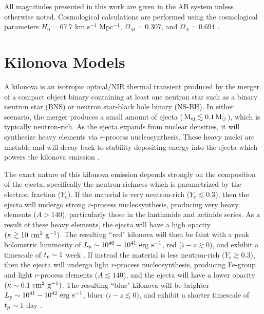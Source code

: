 All magnitudes presented in this work are given in the AB system unless otherwise noted. Cosmological calculations are performed using the cosmological parameters $H_0 = 67.7$ km s$^{-1}$ Mpc$^{-1}$, $\Omega_M = 0.307$, and $\Omega_{\Lambda} = 0.691$ \citep{Planck2016}.

\clearpage
\section{Kilonova Models}
\label{sec:ch6_models}
A kilonova is an isotropic optical/NIR thermal transient produced by the merger of a compact object binary containing at least one neutron star such as a binary neutron star (BNS) or neutron star-black hole binary (NS-BH). In either scenario, the merger produces a small amount of ejecta ($\rm\,M_{\rm ej} \lesssim 0.1 {\rm\,M_\odot}$), which is typically neutron-rich. As the ejecta expands from nuclear densities, it will synthesize heavy elements via $r$-process nucleosynthesis. These heavy nuclei are unstable and will decay back to stability depositing energy into the ejecta which powers the kilonova emission \citep{LP98,Metzger+10,BarnesKasen13,TanakaHotokezaka13,Metzger2017}.

The exact nature of this kilonova emission depends strongly on the composition of the ejecta, specifically the neutron-richness which is parametrized by the electron fraction ($Y_e$). If the material is very neutron-rich ($Y_e \lesssim 0.3$), then the ejecta will undergo strong $r$-process nucleosynthesis, producing very heavy elements ($A > 140$), particularly those in the lanthanide and actinide series. As a result of these heavy elements, the ejecta will have a high opacity $(\kappa \gtrsim 10 \rm\ cm^2\ g^{-1})$. The resulting ``red" kilonova will then be faint with a peak bolometric luminosity of $L_p \sim10^{40}-10^{41} \rm\ erg\ s^{-1}$, red ($i-z \gtrsim 0$), and exhibit a timescale of $t_p \sim1$ week \citep{BarnesKasen13,TanakaHotokezaka13}. If instead the material is less neutron-rich ($Y_e \gtrsim 0.3$), then the ejecta will undergo light $r$-process nucleosynthesis, producing Fe-group and light $r$-process elements ($A \lesssim 140$), and the ejecta will have a lower opacity $(\kappa \sim0.1 \rm\ cm^2\ g^{-1})$. The resulting ``blue" kilonova will be brighter $L_p \sim10^{41}-10^{42} \rm\ erg\ s^{-1}$, bluer ($i-z \lesssim 0$), and exhibit a shorter timescale of $t_p \sim1$ day \citep{Metzger+10,MetzgerFernandez14}.

